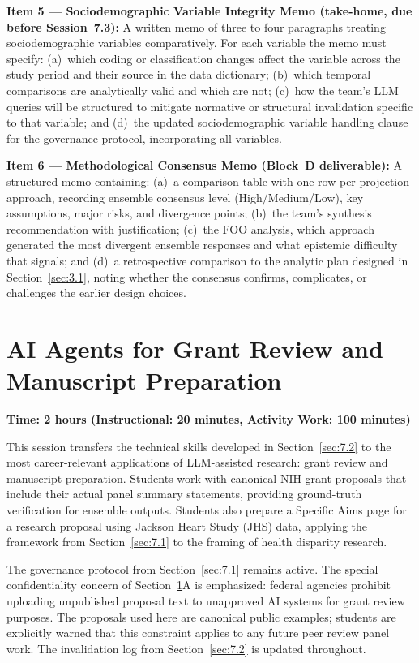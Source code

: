 \textbf{Item 5 --- Sociodemographic Variable Integrity
Memo (take-home, due before Session~7.3):}
A written memo of three to four paragraphs treating
sociodemographic variables comparatively. For each variable
the memo must specify: (a)~which coding or classification
changes affect the variable across the study period and
their source in the data dictionary; (b)~which temporal
comparisons are analytically valid and which are not;
(c)~how the team's LLM queries will be structured to
mitigate normative or structural invalidation specific
to that variable; and (d)~the updated sociodemographic
variable handling clause for the governance protocol,
incorporating all variables. 

\textbf{Item 6 --- Methodological Consensus Memo (Block~D
deliverable):}
A structured memo containing: (a)~a comparison table with one
row per projection approach, recording ensemble consensus level
(High/Medium/Low), key assumptions, major risks, and divergence
points; (b)~the team's synthesis recommendation with justification;
(c)~the FOO analysis, which approach generated the most divergent
ensemble responses and what epistemic difficulty that signals;
and (d)~a retrospective comparison to the analytic plan designed
in Section~\ref{sec:3.1}, noting whether the consensus confirms,
complicates, or challenges the earlier design choices.

\section{AI Agents for Grant Review and Manuscript Preparation}
\label{sec:7.3}

\textbf{Time: 2 hours (Instructional: 20 minutes, Activity Work:
100 minutes)}

This session transfers the technical skills developed in
Section~\ref{sec:7.2} to the most career-relevant applications
of LLM-assisted research: grant review and manuscript preparation.
Students work with canonical NIH grant proposals that include
their actual panel summary statements, providing ground-truth
verification for ensemble outputs. Students also prepare a
Specific Aims page for a research proposal using Jackson Heart
Study (JHS) data, applying the framework from
Section~\ref{sec:7.1} to the framing of health disparity research.

The governance protocol from Section~\ref{sec:7.1} remains active.
The special confidentiality concern of Section~\ref{sec:7.3}A is
emphasized: federal agencies prohibit uploading unpublished
proposal text to unapproved AI systems for grant review purposes.
The proposals used here are canonical public examples; students
are explicitly warned that this constraint applies to any future
peer review panel work. The invalidation log from
Section~\ref{sec:7.2} is updated throughout.

